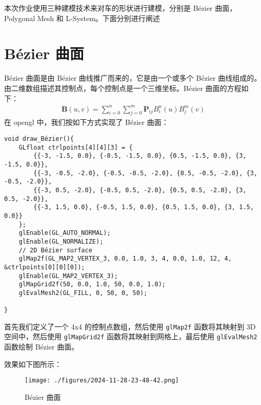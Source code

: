 \documentclass[12pt,hyperref,a4paper,UTF8]{ctexart}
\begin{document}
\cover


\thispagestyle{empty} %

\newpage
\tableofcontents

\newpage
本次作业使用三种建模技术来对车的形状进行建模，分别是 Bézier 曲面，Polygonal Mesh 和 L-System。下面分别进行阐述
\section{Bézier 曲面}
Bézier 曲面是由 Bézier 曲线推广而来的，它是由一个或多个 Bézier 曲线组成的。由二维数组描述其控制点，每个控制点是一个三维坐标。Bézier 曲面的方程如下：
\begin{equation}
    \begin{aligned}
        \mathbf{B}(u, v) = \sum_{i=0}^{n} \sum_{j=0}^{m} \mathbf{P}_{ij} B_{i}^{n}(u) B_{j}^{m}(v)
    \end{aligned}
\end{equation}
在 opengl 中，我们按如下方式实现了 Bézier 曲面：

\begin{verbatim}
void draw_Bézier(){
    GLfloat ctrlpoints[4][4][3] = {
        {{-3, -1.5, 0.0}, {-0.5, -1.5, 0.0}, {0.5, -1.5, 0.0}, {3, -1.5, 0.0}},
        {{-3, -0.5, -2.0}, {-0.5, -0.5, -2.0}, {0.5, -0.5, -2.0}, {3, -0.5, -2.0}},
        {{-3, 0.5, -2.0}, {-0.5, 0.5, -2.0}, {0.5, 0.5, -2.0}, {3, 0.5, -2.0}},
        {{-3, 1.5, 0.0}, {-0.5, 1.5, 0.0}, {0.5, 1.5, 0.0}, {3, 1.5, 0.0}}
    };
    glEnable(GL_AUTO_NORMAL);
    glEnable(GL_NORMALIZE);
    // 2D Bézier surface
    glMap2f(GL_MAP2_VERTEX_3, 0.0, 1.0, 3, 4, 0.0, 1.0, 12, 4, &ctrlpoints[0][0][0]);
    glEnable(GL_MAP2_VERTEX_3);
    glMapGrid2f(50, 0.0, 1.0, 50, 0.0, 1.0);
    glEvalMesh2(GL_FILL, 0, 50, 0, 50);

}
\end{verbatim}

首先我们定义了一个 4x4 的控制点数组，然后使用 \texttt{glMap2f} 函数将其映射到 3D 空间中，然后使用 \texttt{glMapGrid2f} 函数将其映射到网格上，最后使用 \texttt{glEvalMesh2} 函数绘制 Bézier 曲面。

效果如下图所示：

\begin{figure}[H]
    \centering
    \texttt{[image: ./figures/2024-11-28-23-48-42.png]}
    \caption{Bézier 曲面}
\end{figure}
\end{document}

